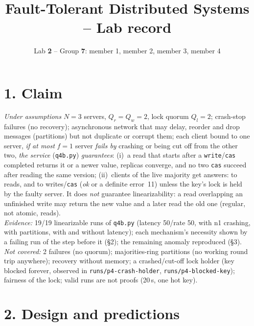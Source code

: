 \documentclass[a4paper,10pt]{article}
\title{Fault-Tolerant Distributed Systems -- Lab record}
\author{Lab \textbf{2} -- Group \textbf{7}: member 1, member 2, member 3, member 4}
\date{}
\newcommand{\run}[1]{\texttt{runs/#1}}
\begin{document}
\maketitle
\vspace{-3em}

\section*{1. Claim}

\noindent\emph{Under assumptions} $N=3$ servers, $Q_r=Q_w=2$, lock quorum
$Q_l=2$; crash-stop failures (no recovery); asynchronous network that may
delay, reorder and drop messages (partitions) but not duplicate or corrupt
them; each client bound to one server, \emph{if at most} $f=1$ server
\emph{fails by} crashing or being cut off from the other two, \emph{the
service} (\texttt{q4b.py}) \emph{guarantees}: (i)~a read that starts after a
\texttt{write}/\texttt{cas} completed returns it or a newer value, replicas
converge, and no two \texttt{cas} succeed after reading the same version;
(ii)~clients of the live majority get answers: to reads, and to
writes/\texttt{cas} (\emph{ok} or a definite error~11) unless the key's
lock is held by the faulty server. It does \emph{not} guarantee linearizability: a read
overlapping an unfinished write may return the new value and a later read
the old one (regular, not atomic, reads).\\
\emph{Evidence:} 19/19 linearizable runs of \texttt{q4b.py} (latency 50/rate
50, with n1 crashing, with partitions, with and without latency); each
mechanism's necessity shown by a failing run of the step before it (\S2);
the remaining anomaly reproduced (\S3).\\
\emph{Not covered:} 2 failures (no quorum); majorities-ring partitions (no
working round trip anywhere); recovery without memory; a crashed/cut-off
lock holder (key blocked forever, observed in \run{p4-crash-holder}, \run{p4-blocked-key});
fairness of the lock; valid runs are not proofs (20\,s, one hot key).

\section*{2. Design and predictions}
\end{document}
